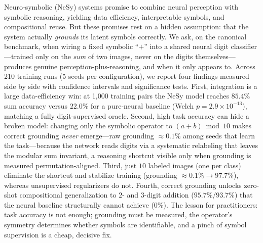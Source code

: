 Neuro-symbolic (NeSy) systems promise to combine neural perception with symbolic reasoning,
yielding data efficiency, interpretable symbols, and compositional reuse. But these promises rest
on a hidden assumption: that the system actually \emph{grounds} its latent symbols correctly. We
ask, on the canonical \mnistadd benchmark, when wiring a fixed symbolic ``$+$'' into a shared neural
digit classifier---trained only on the \emph{sum} of two images, never on the digits themselves---
produces genuine perception-plus-reasoning, and when it only appears to. Across 210 training runs
(5 seeds per configuration), we report four findings measured side by side with confidence intervals
and significance tests. First, integration is a large data-efficiency win: at 1{,}000 training pairs
the NeSy model reaches $85.4\%$ sum accuracy versus $22.0\%$ for a pure-neural baseline (Welch
$p{=}2.9{\times}10^{-13}$), matching a fully digit-supervised oracle. Second, high task accuracy can
hide a broken model: changing only the symbolic operator to $(a{+}b)\bmod 10$ makes correct grounding
\emph{never} emerge---raw grounding $\approx0.1\%$ among seeds that learn the task---because the
network reads digits via a systematic relabeling that leaves the modular sum invariant, a reasoning
shortcut visible only when grounding is measured permutation-aligned. Third, just $10$ labeled images
(one per class) eliminate the shortcut and stabilize training (grounding $\approx0.1\%\to97.7\%$),
whereas unsupervised regularizers do not. Fourth, correct grounding unlocks zero-shot compositional
generalization to $2$- and $3$-digit addition ($95.7\%$/$93.7\%$) that the neural baseline structurally
cannot achieve ($0\%$). The lesson for practitioners: task accuracy is not enough; grounding must be
measured, the operator's symmetry determines whether symbols are identifiable, and a pinch of symbol
supervision is a cheap, decisive fix.
